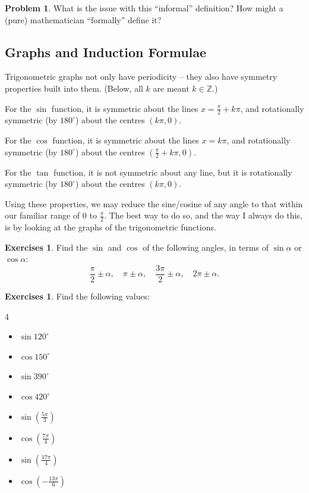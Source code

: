 \documentclass[11pt]{article}
\theoremstyle{definition}
\newtheorem{examples}[theorem]{Exercises}
\newtheorem{problem}[theorem]{Problem}
\theoremstyle{remark}
\newcommand{\pqty}[1]{\left(#1\right)}
\newcommand{\flatfrac}[2]{\frac{#1}{#2}}
\newcommand{\ZZ}{\mathbb{Z}}
\newcommand{\degree}{^{\circ}}
\begin{document}
\begin{problem}\label{tmua-2-unit-016}
    What is the issue with this ``informal'' definition? How might a (pure) mathematician ``formally'' define it?
\end{problem}

\subsection{Graphs and Induction Formulae}\label{tmua-2-subsection-006}

Trigonometric graphs not only have periodicity -- they also have symmetry properties built into them. (Below, all \(k\) are meant \(k \in \ZZ\).)

For the \(\sin\) function, it is symmetric about the lines \(x = \flatfrac{\pi}{2} + k \pi\), and rotationally symmetric (by \(180\degree\)) about the centres \(\pqty{k \pi, 0}\).

For the \(\cos\) function, it is symmetric about the lines \(x = k \pi\), and rotationally symmetric (by \(180\degree\)) about the centres \(\pqty{\flatfrac{\pi}{2} + k \pi, 0}\).

For the \(\tan\) function, it is not symmetric about any line, but it is rotationally symmetric (by \(180 \degree\)) about the centres \(\pqty{k \pi, 0}\).

Using these properties, we may reduce the sine/cosine of any angle to that within our familiar range of \(0\) to \(\flatfrac{\pi}{2}\). The best way to do so, and the way I always do this, is by looking at the graphs of the trigonometric functions.

\begin{examples}\label{tmua-2-unit-017}
    Find the \(\sin\) and \(\cos\) of the following angles, in terms of \(\sin \alpha\) or \(\cos \alpha\):
    \[
        \frac{\pi}{2} \pm \alpha, \quad \pi \pm \alpha, \quad \frac{3\pi}{2} \pm \alpha, \quad 2\pi \pm \alpha.
    \]
\end{examples}

\begin{examples}\label{tmua-2-unit-018}
    Find the following values:
    \begin{multicols}{4}
        \begin{itemize}
            \item \(\sin 120 \degree\)
            \item \(\cos 150 \degree\)
            \item \(\sin 390 \degree\)
            \item \(\cos 420 \degree\)
            \item \(\sin \pqty{\flatfrac{5\pi}{3}}\)
            \item \(\cos \pqty{\flatfrac{7\pi}{4}}\)
            \item \(\sin \pqty{\flatfrac{17\pi}{4}}\)
            \item \(\cos \pqty{- \flatfrac{13\pi}{6}}\)
        \end{itemize}
    \end{multicols}
\end{examples}
\end{document}
